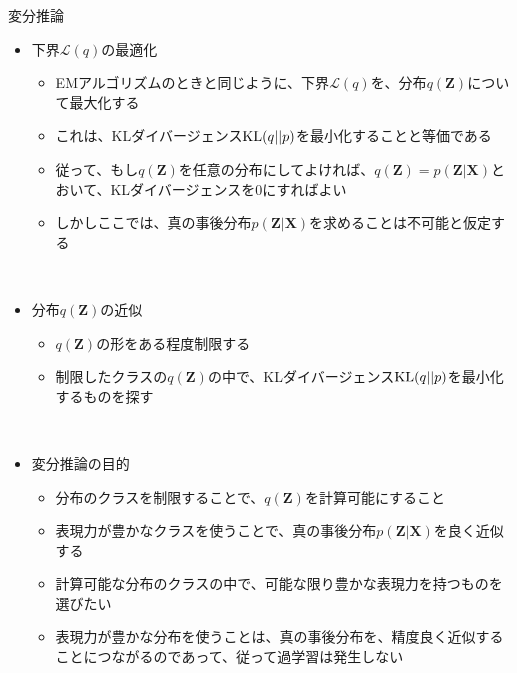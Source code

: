 \documentclass[dvipdfmx,notheorems,t]{beamer}
\begin{document}
\begin{frame}{変分推論}
\begin{itemize}
	\framebreak
	
	\item 下界$\mathcal{L}(q)$の最適化
	\begin{itemize}
		\item EMアルゴリズムのときと同じように、下界$\mathcal{L}(q)$を、分布$q(\bm{Z})$について最大化する
		\item これは、KLダイバージェンス$\operatorname{KL} (q || p)$を最小化することと等価である
		\newline
		\item 従って、\color{red}もし$q(\bm{Z})$を任意の分布にしてよければ\normalcolor 、$q(\bm{Z}) = p(\bm{Z} | \bm{X})$とおいて、KLダイバージェンスを$0$にすればよい
		\newline
		\item しかしここでは、\color{red}真の事後分布$p(\bm{Z} | \bm{X})$を求めることは不可能\normalcolor と仮定する
	\end{itemize} \
	
	\item 分布$q(\bm{Z})$の近似
	\begin{itemize}
		\item $q(\bm{Z})$の形をある程度\alert{制限する}
		\item 制限したクラスの$q(\bm{Z})$の中で、KLダイバージェンス$\operatorname{KL} (q || p)$を最小化するものを探す
	\end{itemize} \
	
	\item 変分推論の目的
	\begin{itemize}
		\item 分布のクラスを制限することで、$q(\bm{Z})$を計算可能にすること
		\item 表現力が豊かなクラスを使うことで、真の事後分布$p(\bm{Z} | \bm{X})$を良く近似する
		\newline
		\item 計算可能な分布のクラスの中で、\alert{可能な限り豊かな表現力を持つ}ものを選びたい
		\item 表現力が豊かな分布を使うことは、真の事後分布を、精度良く近似することにつながるのであって、従って\alert{過学習は発生しない}
	\end{itemize}
\end{itemize}

\end{frame}
\end{document}
